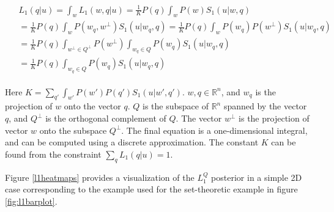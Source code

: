 \documentclass[OpenMind]{stjour}
\newcommand{\Listener}{L}
\newcommand{\QLONE}{\Listener_{{1}}^{{Q}}}
\begin{document}



















	 \begin{align}
	 \begin{split}
	&L_1(q | u) = \int_{w}L_1(w,q | u)
	= \frac{1}{K}P(q) \int_{w}P(w)S_1(u|w,q)  \\
	&= \frac{1}{K}P(q) \int_{w}P(w_q, w^\bot)S_1(u|w_q,q) 
	= \frac{1}{K}P(q) \int_{w}P(w_q) P(w^\bot)S_1(u|w_q,q) \\
	&= \frac{1}{K}P(q) \int_{w^\bot \in Q^\bot}P(w^\bot)  \int_{w_q \in Q}P(w_q) S_1(u|w_q,q) \\
	&= \frac{1}{K}P(q)  \int_{w_q \in Q}P(w_q) S_1(u|w_q,q) \nonumber
	\end{split}
	 \end{align}
	



	Here $K = \sum_{q'} \int_{w'} P(w')P(q')S_1(u|w',q')$. $w, q\in \mathbb{R}^n$, and $w_q$ is the projection of $w$ onto the vector $q$. $Q$ is the subspace of $\mathbb{R}^n$ spanned by the vector $q$, and $Q^\bot$ is the orthogonal complement of $Q$. 
	The vector $w^\bot$ is the projection of vector $w$ onto the subspace $Q^\bot$. The final equation is a one-dimensional integral, and can be computed using a discrete approximation. The constant $K$ can be found from the constraint $\sum_q L_1(q|u) = 1$. 

	Figure \ref{l1heatmaps} provides a visualization of the $\QLONE$ posterior in a simple 2D case corresponding to the example used for the set-theoretic example in figure \ref{fig:l1barplot}.


\end{document}
